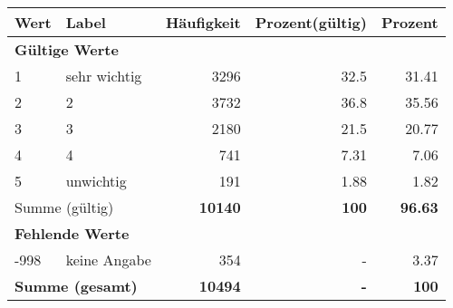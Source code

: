      \begin{longtable}{lXrrr}
     \toprule
     \textbf{Wert} & \textbf{Label} & \textbf{Häufigkeit} & \textbf{Prozent(gültig)} & \textbf{Prozent} \\
     \endhead
     \midrule
     \multicolumn{5}{l}{\textbf{Gültige Werte}}\\

     1 &
     \multicolumn{1}{X}{ sehr wichtig   } &


       \num{3296} &
       \num[round-mode=places,round-precision=2]{32,5} &
         \num[round-mode=places,round-precision=2]{31,41} \\

     2 &
     \multicolumn{1}{X}{ 2   } &


       \num{3732} &
       \num[round-mode=places,round-precision=2]{36,8} &
         \num[round-mode=places,round-precision=2]{35,56} \\

     3 &
     \multicolumn{1}{X}{ 3   } &


       \num{2180} &
       \num[round-mode=places,round-precision=2]{21,5} &
         \num[round-mode=places,round-precision=2]{20,77} \\

     4 &
     \multicolumn{1}{X}{ 4   } &


       \num{741} &
       \num[round-mode=places,round-precision=2]{7,31} &
         \num[round-mode=places,round-precision=2]{7,06} \\

     5 &
     \multicolumn{1}{X}{ unwichtig   } &


       \num{191} &
       \num[round-mode=places,round-precision=2]{1,88} &
         \num[round-mode=places,round-precision=2]{1,82} \\
     \midrule
     \multicolumn{2}{l}{Summe (gültig)} &
       \textbf{\num{10140}} &
     \textbf{100} &
       \textbf{\num[round-mode=places,round-precision=2]{96,63}} \\
     \multicolumn{5}{l}{\textbf{Fehlende Werte}}\\
       -998 &
       keine Angabe &
         \num{354} &
        - &
         \num[round-mode=places,round-precision=2]{3,37} \\
     \midrule
     \multicolumn{2}{l}{\textbf{Summe (gesamt)}} &
          \textbf{\num{10494}} &
        \textbf{-} &
        \textbf{100} \\
     \bottomrule
     \end{longtable}
     
